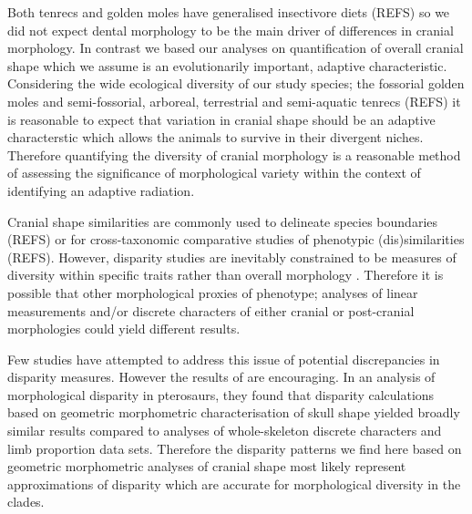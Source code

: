 \documentclass[12pt,a4paper]{article}
\begin{document}

Both tenrecs and golden moles have generalised insectivore diets (REFS) so we did not expect dental morphology to be the main driver of differences in cranial morphology. In contrast we based our analyses on quantification of overall cranial shape which we assume is an evolutionarily important, adaptive characteristic. Considering the wide ecological diversity of our study species; the fossorial golden moles and semi-fossorial, arboreal, terrestrial and semi-aquatic tenrecs (REFS) it is reasonable to expect that variation in cranial shape should be an adaptive characterstic which allows the animals to survive in their divergent niches. Therefore quantifying the diversity of cranial morphology is a reasonable method of assessing the significance of morphological variety within the context of identifying an adaptive radiation.

Cranial shape similarities are commonly used to delineate species boundaries (REFS) or for cross-taxonomic comparative studies of phenotypic (dis)similarities (REFS). However, disparity studies are inevitably constrained to be measures of diversity within specific traits rather than overall morphology \citep{Roy1997}. Therefore it is possible that other morphological proxies of phenotype; analyses of linear measurements and/or discrete characters of either cranial or post-cranial morphologies could yield different results. 

Few studies have attempted to address this issue of potential discrepancies in disparity measures. However the results of \citep{Foth2012} are encouraging. In an analysis of morphological disparity in pterosaurs, they found that disparity calculations based on geometric morphometric characterisation of skull shape yielded broadly similar results compared to analyses of whole-skeleton discrete characters and limb proportion data sets. Therefore the disparity patterns we find here based on geometric morphometric analyses of cranial shape most likely represent approximations of disparity which are accurate for morphological diversity in the clades. 
\end{document}
